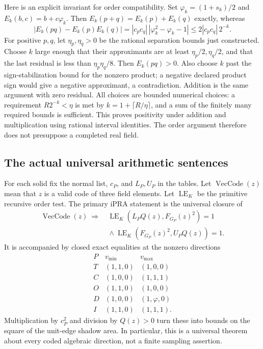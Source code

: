 \documentclass[11pt,a4paper]{article}
\newcommand{\ph}{\varphi}
\newcommand{\abs}[1]{\left|#1\right|}
\begin{document}
Here is an explicit invariant for order compatibility. Set $\ph_k=(1+s_k)/2$ and $E_k(b,c)=b+c\ph_k$. Then $E_k(p+q)=E_k(p)+E_k(q)$ exactly, whereas
\[
 \abs{E_k(pq)-E_k(p)E_k(q)}
 =\abs{c_pc_q}\,\abs{\ph_k^2-\ph_k-1}
 \le2\abs{c_pc_q}\,2^{-k}.
\]
For positive $p,q$, let $\eta_p,\eta_q>0$ be the rational separation bounds just constructed. Choose $k$ large enough that their approximants are at least $\eta_p/2,\eta_q/2$, and that the last residual is less than $\eta_p\eta_q/8$. Then $E_k(pq)>0$. Also choose $k$ past the sign-stabilization bound for the nonzero product; a negative declared product sign would give a negative approximant, a contradiction. Addition is the same argument with zero residual. All choices are bounded numerical choices: a requirement $R2^{-k}<\eta$ is met by $k=1+\lceil R/\eta\rceil$, and a sum of the finitely many required bounds is sufficient. This proves positivity under addition and multiplication using rational interval identities. The order argument therefore does not presuppose a completed real field.

\subsection{The actual universal arithmetic sentences}
For each solid fix the normal list, $c_P$, and $L_P,U_P$ in the tables. Let $\operatorname{VecCode}(z)$ mean that $z$ is a valid code of three field elements. Let $\operatorname{LE}_K$ be the primitive recursive order test. The primary iPRA statement is the universal closure of
\begin{equation}\label{eq:iprasentence}
\begin{split}
 \operatorname{VecCode}(z)\ \Longrightarrow\ &
 \operatorname{LE}_K(L_PQ(z),F_{G_P}(z)^2)=1\\
 &{}\land\operatorname{LE}_K(F_{G_P}(z)^2,U_PQ(z))=1.
\end{split}
\end{equation}
It is accompanied by closed exact equalities at the nonzero directions
\[
\begin{array}{c|cc}
P&v_{\min}&v_{\max}\\\hline
T&(1,1,0)&(1,0,0)\\
C&(1,0,0)&(1,1,1)\\
O&(1,1,0)&(1,0,0)\\
D&(1,0,0)&(1,\ph,0)\\
I&(1,1,0)&(1,1,1).
\end{array}
\]
Multiplication by $c_P^2$ and division by $Q(z)>0$ turn these into bounds on the square of the unit-edge shadow area. In particular, this is a universal theorem about every coded algebraic direction, not a finite sampling assertion.
\end{document}
